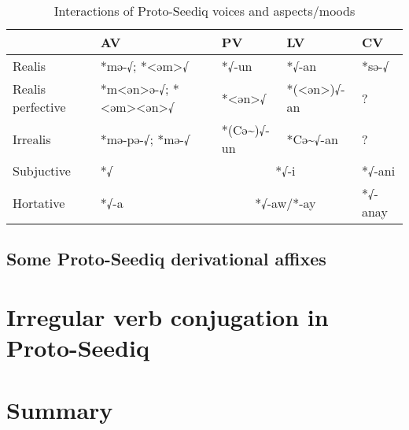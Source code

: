 \begin{table}[!htbp]
\centering
\caption{Interactions of Proto-Seediq voices and aspects/moods}
\label{tab:psed_voice_tam}
\begin{tabular}{lllll}
\hline
                  & AV                    & PV            & LV             & CV      \\ \hline
Realis            & *mə-√; *<əm>√         & *√-un         & *√-an          & *sə-√   \\
Realis perfective & *m<ən>ə-√; *<əm><ən>√ & *<ən>√        & *(<ən>)√-an    & ?       \\
Irrealis          & *mə-pə-√; *mə-√       & *(Cə\~{})√-un & *Cə\~{}√-an    & ?       \\
Subjuctive        & *√                    & \multicolumn{2}{c}{*√-i}       & *√-ani  \\
Hortative         & *√-a                  & \multicolumn{2}{c}{*√-aw/*-ay} & *√-anay \\ \hline
\end{tabular}
\end{table}



\subsection{Some Proto-Seediq derivational affixes} \label{sec:psed_deri_affixes}
\lipsum[1-10]

\section{Irregular verb conjugation in Proto-Seediq} \label{sec:psed_irr_v}



\section{Summary}
\lipsum[1-4]